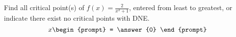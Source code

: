 \documentclass{ximera}
\author{Gregory Hartman \and Matthew Carr}
\begin{document}
\begin{exercise}



Find all critical point(s) of $f(x)=\frac{2}{x^2+1}$, entered from least to greatest, or indicate there exist no critical points with DNE.
\[
x
\begin{prompt}
= \answer{0}
\end{prompt}
\]


\end{exercise}
\end{document}
